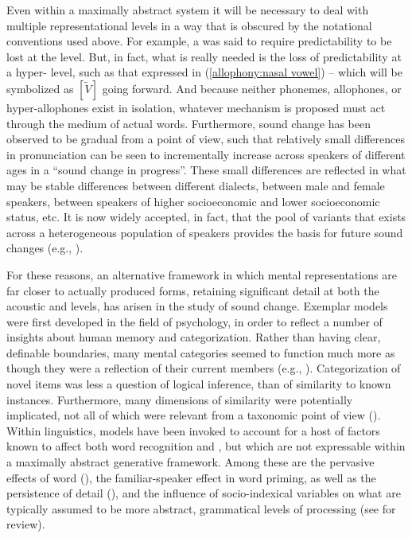 Even within a maximally abstract system it will be necessary to deal
with multiple representational levels in a way that is obscured by
the notational conventions used above. For example, a 
was said to require predictability to be lost at the  level.
But, in fact, what is really needed is the loss of predictability
at a hyper- level, such as that expressed in (\ref{allophony:nasal vowel})
– which will be symbolized as $[\tilde{V}]$ going forward. And because
neither phonemes, allophones, or hyper-allophones exist in isolation,
whatever mechanism is proposed must act through the medium of actual
words. Furthermore, sound change has been observed to be gradual from
a  point of view, such that relatively small differences in
pronunciation can be seen to incrementally increase across speakers
of different ages in a “sound change in progress”. These small
differences are reflected in what may be stable differences between
different dialects, between male and female speakers, between speakers
of higher socioeconomic and lower socioeconomic status, etc. It is
now widely accepted, in fact, that the pool of  variants that
exists across a heterogeneous population of speakers provides the
basis for future sound changes (e.g., \citealt{Guy2008}).

For these reasons, an alternative framework in which mental representations
are far closer to actually produced forms, retaining significant detail
at both the acoustic and  levels, has arisen in the study
of sound change. Exemplar models were first developed in the field
of psychology, in order to reflect a number of insights about human
memory and categorization. Rather than having clear, definable boundaries,
many mental categories seemed to function much more as though they
were a reflection of their current members (e.g., \citealt{Rosch1977}).
Categorization of novel items was less a question of logical inference,
than of similarity to known instances. Furthermore, many dimensions
of similarity were potentially implicated, not all of which were relevant
from a taxonomic point of view (\citealt{Nosofsky1988,Luce1986}).
Within linguistics,  models have been invoked to account for
a host of factors known to affect both word recognition and ,
but which are not expressable within a maximally abstract generative
framework. Among these are the pervasive effects of word 
(\citealt{Bybee2001}), the familiar-speaker effect in word priming,
as well as the persistence of  detail (\citealt{tilsen2009subphonemic}),
and the influence of socio-indexical variables on what are typically
assumed to be more abstract, grammatical levels of processing (see
\citealt{docherty2014evaluation} for review). 

